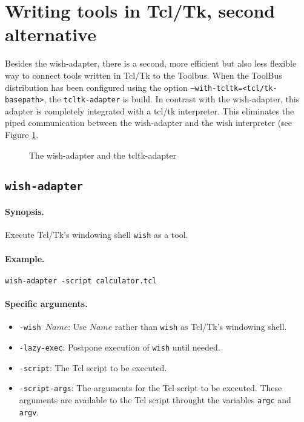 
\section{\label{ToolsInTcl2}Writing tools in Tcl/Tk, second alternative}

Besides the wish-adapter, there is a second, more efficient but also
less flexible way to connect tools written in Tcl/Tk to the Toolbus.
When the ToolBus distribution has been configured using the option
{\tt --with-tcltk=<tcl/tk-basepath>}, the {\tt tcltk-adapter} is build.
In contrast with the wish-adapter, this adapter is completely integrated 
with a tcl/tk interpreter. This eliminates the piped communication between
the wish-adapter and the wish interpreter (see Figure \ref{tcltk-adapters}.

\begin{figure}[htb]
  \centerline{}
  \caption{\label{tcltk-adapters}The wish-adapter and the tcltk-adapter}
\end{figure}
 

\subsection{\label{wish-adapter}{\tt wish-adapter}}

\paragraph{Synopsis.} Execute Tcl/Tk's windowing shell {\tt wish} as a tool.

\paragraph{Example.} {\tt wish-adapter -script calculator.tcl}

\paragraph{Specific arguments.}
\begin{itemize}
\item {\tt -wish $Name$}: Use $Name$ rather than {\tt wish} as Tcl/Tk's windowing shell.
\item {\tt -lazy-exec}: Postpone execution of {\tt wish} until needed.
\item {\tt -script}: The Tcl script to be executed.
\item {\tt -script-args}: The arguments for the Tcl script to be executed.
      These arguments are available to the Tcl script throught the variables
      {\tt argc} and {\tt argv}.
\end{itemize}

